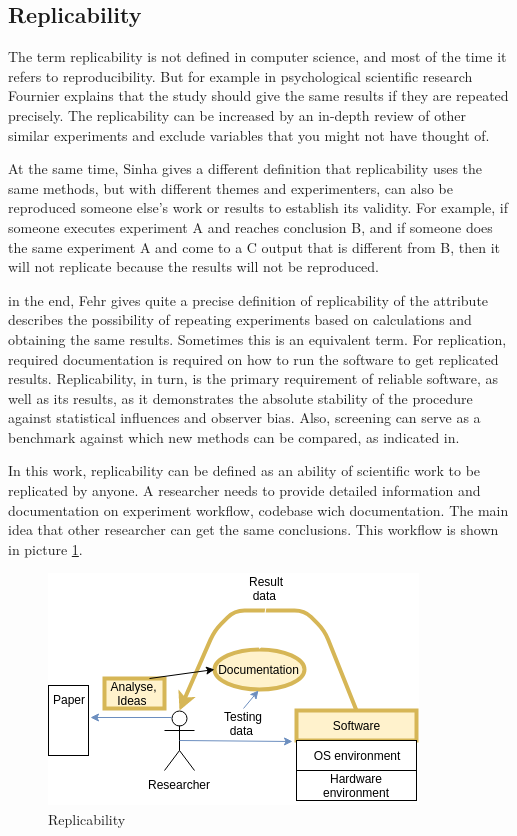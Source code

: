 \documentclass{vldb}
\begin{document}
\subsection{Replicability}
The term replicability is not defined in computer science, and most of the time it refers to reproducibility. But for example in psychological scientific research Fournier\cite{Four} explains that the study should give the same results if they are repeated precisely. The replicability can be increased by an in-depth review of other similar experiments and exclude variables that you might not have thought of. \par
At the same time, Sinha\cite{For} gives a different definition that replicability uses the same methods, but with different themes and experimenters,  can also be reproduced someone else's work or results to establish its validity. For example, if someone executes experiment A and reaches conclusion B, and if someone does the same experiment A and come to a C output that is different from B, then it will not replicate because the results will not be reproduced. \par
in the end, Fehr\cite{DBLP:journals/corr/FehrHHS16} gives quite a precise definition of replicability of the attribute describes the possibility of repeating experiments based on calculations and obtaining the same results. Sometimes this is an equivalent term. For replication, required documentation is required on how to run the software to get replicated results. Replicability, in turn, is the primary requirement of reliable software, as well as its results, as it demonstrates the absolute stability of the procedure against statistical influences and observer bias. Also, screening can serve as a benchmark against which new methods can be compared, as indicated in. \par
In this work, replicability can be defined as an ability of scientific work to be replicated by anyone. A researcher needs to provide detailed information and documentation on experiment workflow, codebase wich documentation. The main idea that other researcher can get the same conclusions. This workflow is shown in picture \ref{fig:replicability}.\par
\begin{figure}[h!]
  \includegraphics[scale=0.6]{fig/replicability.png}
  \caption{Replicability}
  \label{fig:replicability}
\end{figure}
\end{document}
